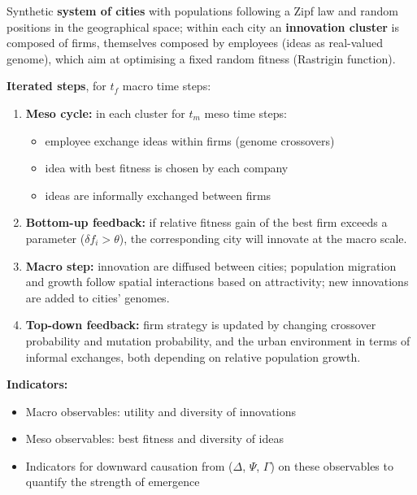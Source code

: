 \documentclass[a0paper]{tikzposter}
\begin{document}
{            \begin{multicols}{3}
            
            Synthetic \textbf{system of cities} with populations following a Zipf law and random positions in the geographical space; within each city an \textbf{innovation cluster} is composed of firms, themselves composed by employees (ideas as real-valued genome), which aim at optimising a fixed random fitness (Rastrigin function).
            
            \vspace{1.5cm}
            
            \textbf{Iterated steps}, for $t_f$ macro time steps:
            \begin{enumerate}
\item \textbf{Meso cycle:} in each cluster for $t_m$ meso time steps:
    \begin{itemize}
        \item employee exchange ideas within firms (genome crossovers)
        \item idea with best fitness is chosen by each company
        \item ideas are informally exchanged between firms
    \end{itemize}
\item \textbf{Bottom-up feedback:} if relative fitness gain of the best firm exceeds a parameter  ($\delta f_i > \theta$), the corresponding city will innovate at the macro scale.
\item \textbf{Macro step:} innovation are diffused between cities; population migration and growth follow spatial interactions based on attractivity; new innovations are added to cities' genomes.
        
\item \textbf{Top-down feedback:} firm strategy is updated by changing crossover probability and mutation probability, and the urban environment in terms of informal exchanges, both depending on relative population growth.
\end{enumerate}
            
            \vspace{1.5cm}
            
            \textbf{Indicators:}
            \begin{itemize}
            	\item Macro observables: utility and diversity of innovations
            	\item Meso observables: best fitness and diversity of ideas
            	\item Indicators for downward causation from \cite{rosas2020reconcilingshort} ($\Delta$, $\Psi$, $\Gamma$) on these observables to quantify the strength of emergence
            \end{itemize}
            

\end{multicols}}
\end{document}
